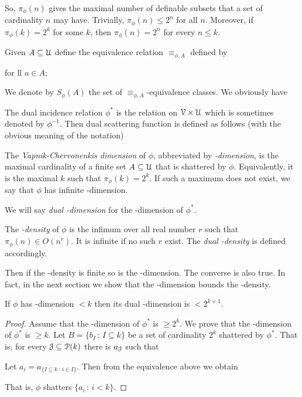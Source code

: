 \documentclass[sputnik.tex]{subfiles}
\begin{document}
So, $\pi_\phi(n)$ gives the maximal number of definable subsets that a set of cardinality $n$ may have.
Trivially, $\pi_\phi(n)\le2^n$ for all $n$.
Moreover, if $\pi_\phi(k)=2^k$ for some $k$, then $\pi_\phi(n)=2^n$ for every $n\le k$.

Given $A\subseteq\EuScript U$ define the equivalence relation $\equiv_{\phi,A}$ defined by 

\quad for ll $a\in A$;


We denote by $S_\phi(A)$ the set of $\equiv_{\phi,A}$-equivalence classes. We obviously have


The dual incidence relation $\phi^*$ is the relation on $\EuScript V\times\EuScript U$ which is sometimes denoted by $\phi^{-1}$.
Then dual scattering function is defined as follows (with the obvious meaning of the notation) 


\begin{definition}\label{def_VCdim}
The \emph{Vapnik-Cher\-vo\-nen\-kis dimension\/} of $\phi$, abbreviated by \emph{\vc-dimension}, is the maximal cardinality of a finite set $A\subseteq\EuScript U$ that is shattered by $\phi$.
Equivalently, it is the maximal $k$ such that $\pi_\phi(k)=2^k$.
If such a maximum does not exist,
we say that $\phi$ has infinite \vc-dimension.

We will say \emph{dual \vc-dimension\/} for the \vc-dimension of $\phi^*$.

The \emph{\vc-density\/} of $\phi$ is the infimum over all real number $r$ such that $\pi_\phi(n)\in O(n^r)$.
It is infinite if no such $r$ exist.
The  \emph{dual \vc-density\/} is defined accordingly.\QED
\end{definition}


Then if the \vc-density is finite so is the \vc-dimension.
The converse is also true.
In fact, in the next section we show that the \vc-dimension bounds the \vc-density.

\begin{proposition}
If $\phi$ has \vc-dimension $< k$ then its dual \vc-dimension is $< 2^{k+1}$.
\end{proposition}

\begin{proof}
Assume that the \vc-dimension of $\phi^*$ is $\ge 2^k$.
We prove that the \vc-dimension of $\phi^*$ is $\ge k$.
Let $B=\{b_I\,:\,I\subseteq k\}$ be a set of cardinality $2^k$ shattered by $\phi^*$. 
That is, for every $\EuScript J\subseteq \EuScript P(k)$ there is $a_\EuScript J$ such that


Let $a_i=a_{\{I\subseteq k\,:\, i\in I\}}$. Then from the equivalence above we obtain


That is, $\phi$ shatters $\{a_i\,:\,i<k\}$.
\end{proof}
\end{document}
